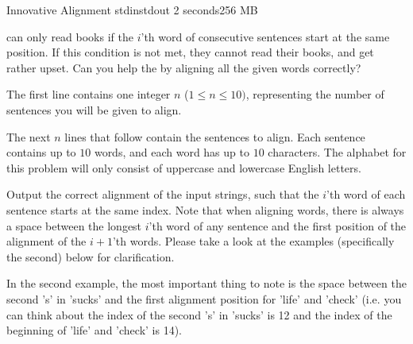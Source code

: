 \begin{problem}{Innovative Alignment}
{stdin}{stdout}
{2 seconds}{256 MB}{}

\Stringers can only read books if the $i$'th word of consecutive sentences start at the same position. If this condition is not met, they cannot read their books, and get rather upset. Can you help the \Stringers by aligning all the given words correctly?

\InputFile

The first line contains one integer $n$ ($1 \leq n \leq 10)$, representing the number of sentences you will be given to align. 

The next $n$ lines that follow contain the sentences to align. Each sentence contains up to $10$ words, and each word has up to $10$ characters. The alphabet for this problem will only consist of uppercase and lowercase English letters.
\OutputFile

Output the correct alignment of the input strings, such that the $i$'th word of each sentence starts at the same index. Note that when aligning words, there is always a space between the longest $i$'th word of any sentence and the first position of the alignment of the $i+1$'th words. Please take a look at the examples (specifically the second) below for clarification. 

\Examples

\begin{example}
%
\end{example}

\begin{example}
%
\end{example}
\Explanation 
In the second example, the most important thing to note is the space between the second 's' in 'sucks' and the first alignment position for 'life' and 'check' (i.e. you can think about the index of the second 's' in 'sucks' is 12 and the index of the beginning of 'life' and 'check' is 14).


\end{problem}